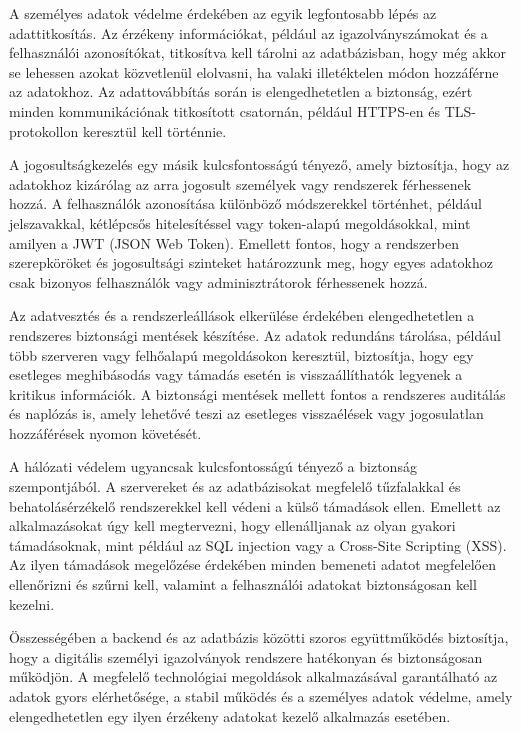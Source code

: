 \documentclass[
]{thesis-ekf}
\theoremstyle{definition}
\theoremstyle{remark}
\begin{document}
	A személyes adatok védelme érdekében az egyik legfontosabb lépés az adattitkosítás. Az érzékeny információkat, például az igazolványszámokat és a felhasználói azonosítókat, titkosítva kell tárolni az adatbázisban, hogy még akkor se lehessen azokat közvetlenül elolvasni, ha valaki illetéktelen módon hozzáférne az adatokhoz. Az adattovábbítás során is elengedhetetlen a biztonság, ezért minden kommunikációnak titkosított csatornán, például HTTPS-en és TLS-protokollon keresztül kell történnie.
	
	A jogosultságkezelés egy másik kulcsfontosságú tényező, amely biztosítja, hogy az adatokhoz kizárólag az arra jogosult személyek vagy rendszerek férhessenek hozzá. A felhasználók azonosítása különböző módszerekkel történhet, például jelszavakkal, kétlépcsős hitelesítéssel vagy token-alapú megoldásokkal, mint amilyen a JWT (JSON Web Token). Emellett fontos, hogy a rendszerben szerepköröket és jogosultsági szinteket határozzunk meg, hogy egyes adatokhoz csak bizonyos felhasználók vagy adminisztrátorok férhessenek hozzá.
	
	Az adatvesztés és a rendszerleállások elkerülése érdekében elengedhetetlen a rendszeres biztonsági mentések készítése. Az adatok redundáns tárolása, például több szerveren vagy felhőalapú megoldásokon keresztül, biztosítja, hogy egy esetleges meghibásodás vagy támadás esetén is visszaállíthatók legyenek a kritikus információk. A biztonsági mentések mellett fontos a rendszeres auditálás és naplózás is, amely lehetővé teszi az esetleges visszaélések vagy jogosulatlan hozzáférések nyomon követését.
	
	A hálózati védelem ugyancsak kulcsfontosságú tényező a biztonság szempontjából. A szervereket és az adatbázisokat megfelelő tűzfalakkal és behatolásérzékelő rendszerekkel kell védeni a külső támadások ellen. Emellett az alkalmazásokat úgy kell megtervezni, hogy ellenálljanak az olyan gyakori támadásoknak, mint például az SQL injection vagy a Cross-Site Scripting (XSS). Az ilyen támadások megelőzése érdekében minden bemeneti adatot megfelelően ellenőrizni és szűrni kell, valamint a felhasználói adatokat biztonságosan kell kezelni.
	
	Összességében a backend és az adatbázis közötti szoros együttműködés biztosítja, hogy a digitális személyi igazolványok rendszere hatékonyan és biztonságosan működjön. A megfelelő technológiai megoldások alkalmazásával garantálható az adatok gyors elérhetősége, a stabil működés és a személyes adatok védelme, amely elengedhetetlen egy ilyen érzékeny adatokat kezelő alkalmazás esetében.
	
\end{document}
